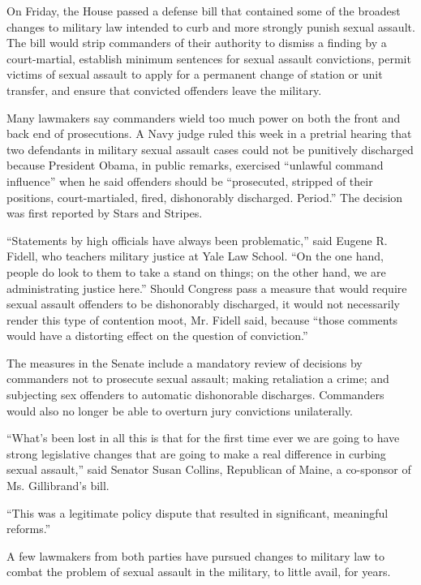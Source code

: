 On Friday, the House passed a defense bill that contained some of the
broadest changes to military law intended to curb and more strongly
punish sexual assault. The bill would strip commanders of their
authority to dismiss a finding by a court-martial, establish minimum
sentences for sexual assault convictions, permit victims of sexual
assault to apply for a permanent change of station or unit transfer, and
ensure that convicted offenders leave the military.

Many lawmakers say commanders wield too much power on both the front and
back end of prosecutions. A Navy judge ruled this week in a pretrial
hearing that two defendants in military sexual assault cases could not
be punitively discharged because President Obama, in public remarks,
exercised ``unlawful command influence'' when he said offenders should
be ``prosecuted, stripped of their positions, court-martialed, fired,
dishonorably discharged. Period.'' The decision was first reported by
Stars and Stripes.

``Statements by high officials have always been problematic,'' said
Eugene R. Fidell, who teachers military justice at Yale Law School. ``On
the one hand, people do look to them to take a stand on things; on the
other hand, we are administrating justice here.'' Should Congress pass a
measure that would require sexual assault offenders to be dishonorably
discharged, it would not necessarily render this type of contention
moot, Mr. Fidell said, because ``those comments would have a distorting
effect on the question of conviction.''

The measures in the Senate include a mandatory review of decisions by
commanders not to prosecute sexual assault; making retaliation a crime;
and subjecting sex offenders to automatic dishonorable discharges.
Commanders would also no longer be able to overturn jury convictions
unilaterally.

``What's been lost in all this is that for the first time ever we are
going to have strong legislative changes that are going to make a real
difference in curbing sexual assault,'' said Senator Susan Collins,
Republican of Maine, a co-sponsor of Ms. Gillibrand's bill.

``This was a legitimate policy dispute that resulted in significant,
meaningful reforms.''

A few lawmakers from both parties have pursued changes to military law
to combat the problem of sexual assault in the military, to little
avail, for years.


